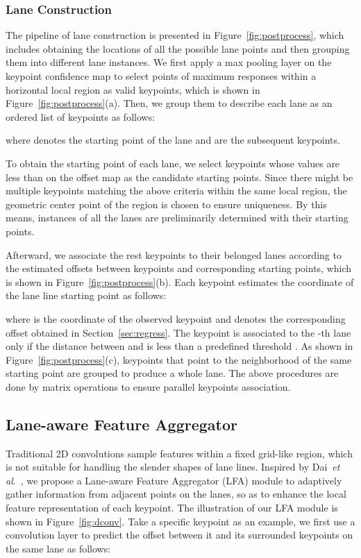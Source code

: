 \documentclass[10pt,twocolumn,letterpaper]{article}
\begin{document}
\subsubsection{Lane Construction}

The pipeline of lane construction is presented in Figure~\ref{fig:postprocess}, which includes obtaining the locations of all the possible lane points and then grouping them into different lane instances. 
We first apply a  max pooling layer on the keypoint confidence map  to select points of maximum responses within a horizontal local region as valid keypoints, which is shown in Figure~\ref{fig:postprocess}(a).
Then, we group them to describe each lane as an ordered list of keypoints as follows:

where  denotes the starting point of the lane and  are the subsequent keypoints. 

To obtain the starting point of each lane, we select keypoints whose values are less than  on the offset map as the candidate starting points.
Since there might be multiple keypoints matching the above criteria within the same local region, the geometric center point of the region is chosen to ensure uniqueness.
By this means, instances of all the lanes are preliminarily determined with their starting points.

Afterward, we associate the rest keypoints to their belonged lanes according to the estimated offsets between keypoints and corresponding starting points, which is shown in Figure~\ref{fig:postprocess}(b).
Each keypoint estimates the coordinate of the lane line starting point as follows:

where  is the coordinate of the observed keypoint and  denotes the corresponding offset obtained in Section~\ref{sec:regress}.
The keypoint  is associated to the -th lane only if the distance between  and  is less than a predefined threshold .
As shown in Figure~\ref{fig:postprocess}(c), keypoints that point to the neighborhood of the same starting point are grouped to produce a whole lane. The above procedures are done by matrix operations to ensure parallel keypoints association.

\subsection{Lane-aware Feature Aggregator}
Traditional 2D convolutions sample features within a fixed grid-like region, which is not suitable for handling the slender shapes of lane lines. 
Inspired by Dai~\textit{et al}.~\cite{dai2017deformable}, we propose a Lane-aware Feature Aggregator (LFA) module to adaptively gather information from adjacent points on the lanes, so as to enhance the local feature representation of each keypoint.
The illustration of our LFA module is shown in Figure~\ref{fig:dconv}. 
Take a specific keypoint as an example, we first use a convolution layer to predict the offset between it and its surrounded  keypoints on the same lane as follows:
\end{document}
